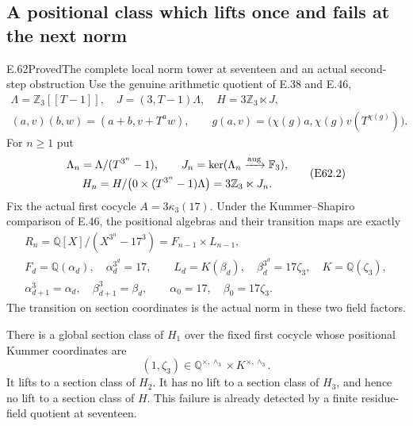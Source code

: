 \subsection{A positional class which lifts once and fails at the next norm}

\begin{statement}{E.62}{Proved}{The complete local norm tower at seventeen and an actual second-step obstruction}
Use the genuine arithmetic quotient of E.38
and E.46,
\[
 \begin{gathered}
 \Lambda=\mathbb Z_3[[T-1]],\quad
 J=(3,T-1)\Lambda,\quad
 H=3\mathbb Z_3\ltimes J,\\
 (a,v)(b,w)=(a+b,v+T^a w),\qquad
 g(a,v)=\bigl(\chi(g)a,\chi(g)v(T^{\chi(g)})\bigr).
 \end{gathered}
 \tag{E62.1}
\]
For $n\ge1$ put
\[
 \begin{gathered}
 \Lambda_n=\Lambda/(T^{3^n}-1),\qquad
 J_n=\ker(\Lambda_n\xrightarrow{\rm aug}\mathbb F_3),\\
 H_n=H/\bigl(0\times(T^{3^n}-1)\Lambda\bigr)
                  =3\mathbb Z_3\ltimes J_n.
 \end{gathered}
 \tag{E62.2}
\]
Fix the actual first cocycle
$A=3\kappa_3(17)$.
Under the Kummer--Shapiro comparison of E.46,
the positional algebras and their transition
maps are exactly
\[
 \begin{gathered}
 R_n=\mathbb Q[X]/(X^{3^n}-17^3)
       =F_{n-1}\times L_{n-1},\\
 F_d=\mathbb Q(\alpha_d),\quad
       \alpha_d^{3^d}=17,\qquad
 L_d=K(\beta_d),\quad
       \beta_d^{3^d}=17\zeta_3,\quad
       K=\mathbb Q(\zeta_3),\\
 \alpha_{d+1}^3=\alpha_d,\quad
 \beta_{d+1}^3=\beta_d,\qquad
 \alpha_0=17,\quad\beta_0=17\zeta_3 .
 \end{gathered}
 \tag{E62.3}
\]
The transition on section coordinates is the
actual norm in these two field factors.

There is a global section class of $H_1$
over the fixed first cocycle whose positional
Kummer coordinates are
\[
                         (1,\zeta_3)\in
               \mathbb Q^{\times,\wedge_3}
                     \times K^{\times,\wedge_3}.
 \tag{E62.4}
\]
It lifts to a section class of $H_2$.
It has no lift to a section class of $H_3$,
and hence no lift to a section class of $H$.
This failure is already detected by a finite
residue-field quotient at seventeen.


\end{statement}
